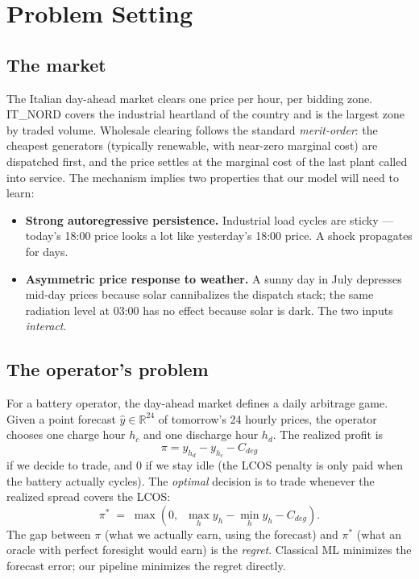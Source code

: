 \documentclass[11pt,a4paper]{article}
\begin{document}
\section{Problem Setting}

\subsection{The market}
The Italian day-ahead market clears one price per hour, per bidding
zone. IT\_NORD covers the industrial heartland of the country and is the
largest zone by traded volume. Wholesale clearing follows the standard
\emph{merit-order}: the cheapest generators (typically renewable, with
near-zero marginal cost) are dispatched first, and the price settles at
the marginal cost of the last plant called into service. The mechanism
implies two properties that our model will need to learn:

\begin{itemize}[leftmargin=1.5em]
  \item \textbf{Strong autoregressive persistence.} Industrial load
    cycles are sticky --- today's 18:00 price looks a lot like
    yesterday's 18:00 price. A shock propagates for days.
  \item \textbf{Asymmetric price response to weather.} A sunny day in
    July depresses mid-day prices because solar cannibalizes the
    dispatch stack; the same radiation level at 03:00 has no effect
    because solar is dark. The two inputs \emph{interact}.
\end{itemize}

\subsection{The operator's problem}
For a battery operator, the day-ahead market defines a daily arbitrage
game. Given a point forecast $\hat{y}\in\mathbb{R}^{24}$ of tomorrow's
24 hourly prices, the operator chooses one charge hour $h_c$ and one
discharge hour $h_d$. The realized profit is
\[
\pi = y_{h_d} - y_{h_c} - C_{deg}
\]
if we decide to trade, and $0$ if we stay idle (the LCOS penalty is only
paid when the battery actually cycles). The \emph{optimal} decision is
to trade whenever the realized spread covers the LCOS:
\[
\pi^{*} \;=\; \max\!\left(0,\;\; \max_{h} y_{h} - \min_{h} y_{h} - C_{deg}\right).
\]
The gap between $\pi$ (what we actually earn, using the forecast) and
$\pi^{*}$ (what an oracle with perfect foresight would earn) is the
\emph{regret}. Classical ML minimizes the forecast error; our pipeline
minimizes the regret directly.
\end{document}
